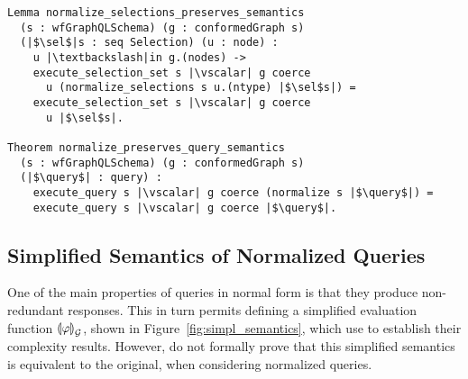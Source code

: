 \begin{verbatim}
Lemma normalize_selections_preserves_semantics
  (s : wfGraphQLSchema) (g : conformedGraph s) 
  (|$\sel$|s : seq Selection) (u : node) :
    u |\textbackslash|in g.(nodes) ->
    execute_selection_set s |\vscalar| g coerce
      u (normalize_selections s u.(ntype) |$\sel$s|) =
    execute_selection_set s |\vscalar| g coerce
      u |$\sel$s|.

Theorem normalize_preserves_query_semantics 
  (s : wfGraphQLSchema) (g : conformedGraph s)
  (|$\query$| : query) :
    execute_query s |\vscalar| g coerce (normalize s |$\query$|) =
    execute_query s |\vscalar| g coerce |$\query$|.
\end{verbatim}


\subsection{Simplified Semantics of Normalized Queries}
\label{sec:simpl-semantics}

One of the main properties of queries in normal form is that they produce non-redundant responses.
This in turn permits defining a simplified evaluation function $\llparenthesis \varphi \rrparenthesis^{}_{\mathcal{G}}$, shown in Figure~\ref{fig:simpl_semantics}, which \HP use to establish their complexity results.
However, \HP do not formally prove that this simplified semantics is equivalent to the original, when considering normalized queries.

